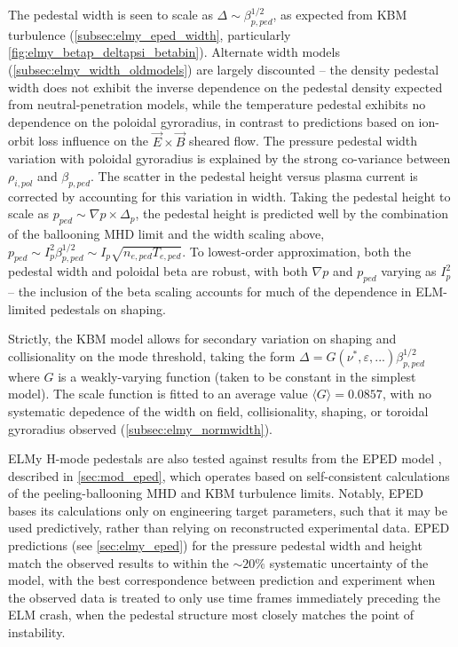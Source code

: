 The pedestal width is seen to scale as $\Delta \sim \beta_{p,ped}^{1/2}$, as expected from KBM turbulence (\cf \cref{subsec:elmy_eped_width}, particularly \cref{fig:elmy_betap_deltapsi_betabin}).  Alternate width models (\cref{subsec:elmy_width_oldmodels}) are largely discounted -- the density pedestal width does not exhibit the inverse dependence on the pedestal density expected from neutral-penetration models, while the temperature pedestal exhibits no dependence on the poloidal gyroradius, in contrast to predictions based on ion-orbit loss influence on the $\vec{E}\times\vec{B}$ sheared flow.  The pressure pedestal width variation with poloidal gyroradius is explained by the strong co-variance between $\rho_{i,pol}$ and $\beta_{p,ped}$.  The scatter in the pedestal height versus plasma current is corrected by accounting for this variation in width.  Taking the pedestal height to scale as $p_{ped} \sim \nabla p \times \Delta_p$, the pedestal height is predicted well by the combination of the ballooning MHD limit and the width scaling above, $p_{ped} \sim I_p^2 \beta_{p,ped}^{1/2} \sim I_p \sqrt{n_{e,ped} T_{e,ped}}$.  To lowest-order approximation, both the pedestal width and poloidal beta are robust, with both $\nabla p$ and $p_{ped}$ varying as $I_p^2$ -- the inclusion of the beta scaling accounts for much of the dependence in ELM-limited pedestals on shaping.

Strictly, the KBM model allows for secondary variation on shaping and collisionality on the mode threshold, taking the form $\Delta = G(\nu^*,\varepsilon,...) \beta_{p,ped}^{1/2}$ where $G$ is a weakly-varying function (taken to be constant in the simplest model).  The scale function is fitted to an average value $\langle G \rangle = 0.0857$, with no systematic depedence of the width on field, collisionality, shaping, or toroidal gyroradius observed (\cref{subsec:elmy_normwidth}).  

ELMy H-mode pedestals are also tested against results from the EPED model \cite{Snyder2011}, described in \cref{sec:mod_eped}, which operates based on self-consistent calculations of the peeling-ballooning MHD and KBM turbulence limits.  Notably, EPED bases its calculations only on engineering target parameters, such that it may be used predictively, rather than relying on reconstructed experimental data.  EPED predictions (see \cref{sec:elmy_eped}) for the pressure pedestal width and height match the observed results to within the $\sim 20\%$ systematic uncertainty of the model, with the best correspondence between prediction and experiment when the observed data is treated to only use time frames immediately preceding the ELM crash, when the pedestal structure most closely matches the point of instability.\nicesectionending

